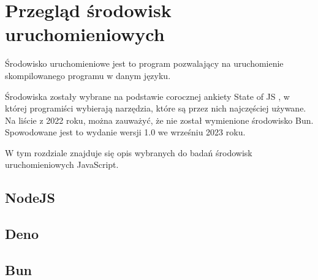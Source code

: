 \section*{Przegląd środowisk uruchomieniowych}
Środowisko uruchomieniowe jest to program pozwalający na uruchomienie skompilowanego programu w danym języku. 

Środowiska zostały wybrane na podstawie corocznej ankiety State of JS \cite{State_of_js:2022}, w której programiści wybierają narzędzia, które są przez nich najczęściej używane. Na liście z 2022 roku, można zauważyć, że nie został wymienione środowisko Bun. Spowodowane jest to wydanie wersji 1.0 we wrześniu 2023 roku.

W tym rozdziale znajduje się opis wybranych do badań środowisk uruchomieniowych JavaScript.

\subsection*{NodeJS}


\subsection*{Deno}

\subsection*{Bun}
